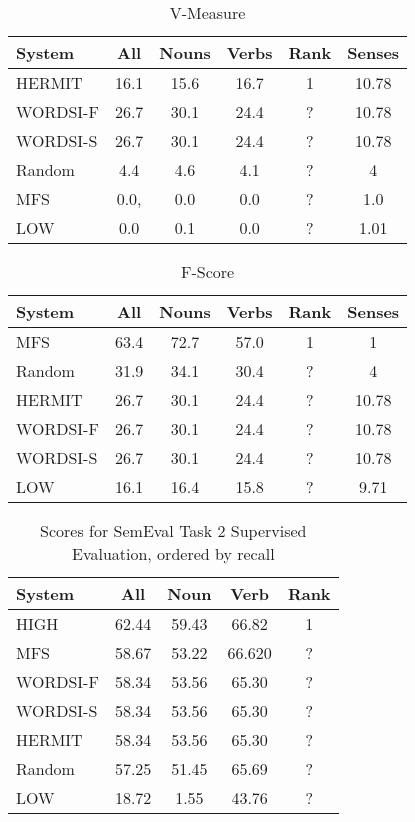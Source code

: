 \documentclass[11pt]{article}
\begin{document}
\begin{table}[htb]
  \small
  \center
  \begin{tabular}{| l | ccccc | }
    \hline
    System & All & Nouns & Verbs & Rank & Senses \\
    \hline
    HERMIT & 16.1 & 15.6 & 16.7 & 1 & 10.78 \\
    WORDSI-F & 26.7 & 30.1 & 24.4 & ? & 10.78 \\
    WORDSI-S & 26.7 & 30.1 & 24.4 & ? & 10.78 \\
    Random & 4.4 & 4.6 & 4.1 & ? & 4 \\
    MFS & 0.0, & 0.0 & 0.0 & ? & 1.0 \\
    LOW & 0.0 & 0.1 & 0.0 &  ? & 1.01 \\
    \hline
  \end{tabular}
  \caption{V-Measure}
  \label{tab:evaluation}
\end{table}

\begin{table}[htb]
  \small
  \center
  \begin{tabular}{| l | ccccc | }
    \hline
    System & All & Nouns & Verbs & Rank & Senses \\
    \hline
    MFS & 63.4 & 72.7 & 57.0 & 1 & 1 \\
    Random & 31.9 & 34.1 & 30.4 & ? & 4 \\
    HERMIT & 26.7 & 30.1 & 24.4 & ? & 10.78 \\
    WORDSI-F & 26.7 & 30.1 & 24.4 & ? & 10.78 \\
    WORDSI-S & 26.7 & 30.1 & 24.4 & ? & 10.78 \\
    LOW & 16.1 & 16.4 & 15.8 & ? & 9.71 \\
    \hline
  \end{tabular}
  \caption{F-Score}
  \label{tab:evaluation}
\end{table}

\begin{table}
  \center
  \small
  \begin{tabular} { | l | cccc |}
      \hline
      System & All & Noun & Verb & Rank \\
      \hline
      HIGH & 62.44 & 59.43 & 66.82 & 1 \\
      MFS & 58.67 & 53.22  & 66.620 & ? \\
      WORDSI-F & 58.34 & 53.56 & 65.30 & ? \\
      WORDSI-S & 58.34 & 53.56 & 65.30 & ? \\
      HERMIT & 58.34 & 53.56 & 65.30 & ? \\
      Random & 57.25 & 51.45 & 65.69 & ? \\
      LOW & 18.72 & 1.55 & 43.76 & ? \\
      \hline
  \end{tabular}
  \caption{Scores for SemEval Task 2 Supervised Evaluation, ordered by recall}
  \label{tab:supervised-sem07}
\end{table}
\end{document}
